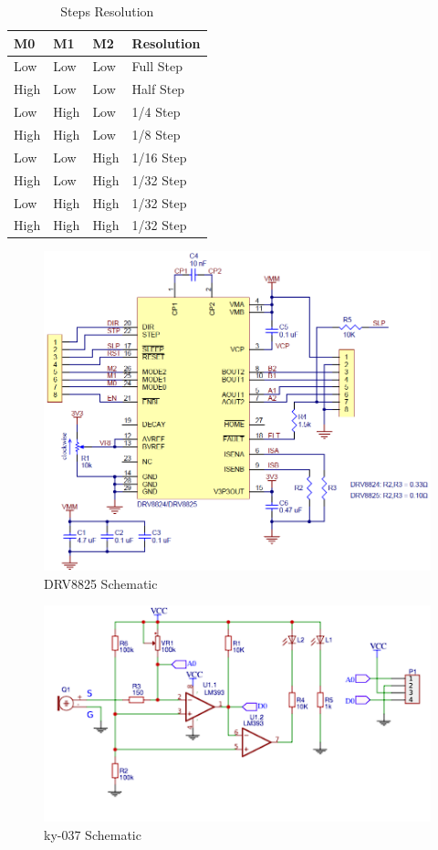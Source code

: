\documentclass[a4paper,12pt]{article}
\begin{document}
\begin{table}[H]
\centering
\begin{tabular}{ | p{2cm}  p{2cm}  p{2cm} p{3cm}| } 
\hline
\textbf{M0} & \textbf{M1} & \textbf{M2} & \textbf{Resolution} \\
\hline
\hline
Low & Low & Low & Full Step\\
High & Low & Low & Half Step\\
Low & High & Low & 1/4 Step\\
High & High & Low & 1/8 Step\\
Low & Low & High & 1/16 Step\\
High & Low & High & 1/32 Step\\
Low & High & High & 1/32 Step\\
High & High & High & 1/32 Step\\
 \hline
\end{tabular}
\caption{Steps Resolution}
 \label{tab:steps}
 \end{table}
 \begin{figure}[H]
    \begin{center}
        \includegraphics[width=12cm]{images/drv8825schematic.png}
        \caption{DRV8825 Schematic}
        \label{fig:drv8825schematic}
    \end{center}
\end{figure}
 \begin{figure}[H]
    \begin{center}
        \includegraphics[width=12cm]{images/ky-037schematic.png}
        \caption{ky-037 Schematic}
        \label{fig:ky-037schematic}
    \end{center}
\end{figure}
\end{document}
